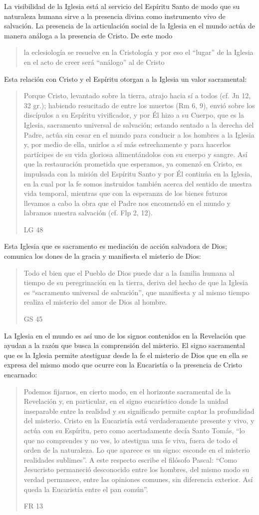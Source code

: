 La visibilidad de la Iglesia está al servicio del Espíritu Santo de modo que su
naturaleza humana sirve a la presencia divina como instrumento vivo de
salvación. La presencia de la articulación social de la Iglesia en el mundo
actúa de manera análoga a la presencia de Cristo. De este modo
\blockquote[{\cite[566]{ninot2009tf}}]{la eclesiología se resuelve en la
  Cristología y por eso el \enquote{lugar} de la Iglesia en el acto de creer
  será \enquote{análogo} al de Cristo}. Esta relación con Cristo y el Espíritu
otorgan a la Iglesia un valor sacramental:
\blockquote[LG 48]{Porque Cristo, levantado sobre la tierra, atrajo hacia sí a
  todos (cf. Jn 12, 32 gr.); habiendo resucitado de entre los muertos (Rm 6, 9),
  envió sobre los discípulos a su Espíritu vivificador, y por Él hizo a su
  Cuerpo, que es la Iglesia, sacramento universal de salvación; estando sentado
  a la derecha del Padre, actúa sin cesar en el mundo para conducir a los
  hombres a la Iglesia y, por medio de ella, unirlos a sí más estrechamente y
  para hacerlos partícipes de su vida gloriosa alimentándolos con su cuerpo y
  sangre. Así que la restauración prometida que esperamos, ya comenzó en Cristo,
  es impulsada con la misión del Espíritu Santo y por Él continúa en la Iglesia,
  en la cual por la fe somos instruidos también acerca del sentido de nuestra
  vida temporal, mientras que con la esperanza de los bienes futuros llevamos a
  cabo la obra que el Padre nos encomendó en el mundo y labramos nuestra
  salvación (cf. Flp 2, 12).}
Esta Iglesia que es sacramento es mediación de acción salvadora de Dios;
comunica los dones de la gracia y manifiesta el misterio de Dios:
\blockquote[GS 45]{Todo el bien que el Pueblo de Dios puede dar a la familia
  humana al tiempo de su peregrinación en la tierra, deriva del hecho de que la
  Iglesia es ``sacramento universal de salvación'', que manifiesta y al mismo
  tiempo realiza el misterio del amor de Dios al hombre.}

La Iglesia en el mundo es así uno de los signos contenidos en la Revelación que
ayudan a la razón que busca la comprensión del misterio. El signo sacramental
que es la Iglesia permite atestiguar desde la fe el misterio de Dios que en ella
se expresa del mismo modo que ocurre con la Eucaristía o la presencia de Cristo
encarnado:
\blockquote[FR 13]{Podemos fijarnos, en cierto modo, en el horizonte sacramental
  de la Revelación y, en particular, en el signo eucarístico donde la unidad
  inseparable entre la realidad y su significado permite captar la profundidad
  del misterio. Cristo en la Eucaristía está verdaderamente presente y vivo, y
  actúa con su Espíritu, pero como acertadamente decía Santo Tomás, \enquote{lo
    que no comprendes y no ves, lo atestigua una fe viva, fuera de todo el orden
    de la naturaleza. Lo que aparece es un signo: esconde en el misterio
    realidades sublimes}. A este respecto escribe el filósofo Pascal:
  \enquote{Como Jesucristo permaneció desconocido entre los hombres, del mismo
    modo su verdad permanece, entre las opiniones comunes, sin diferencia
    exterior. Así queda la Eucaristía entre el pan común}.}

